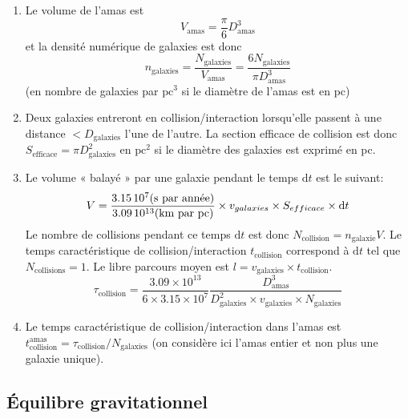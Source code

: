 \documentclass[a4paper,10pt]{report}
\renewcommand{\d}{\ensuremath{\mathrm{d}}}
\renewcommand{\u}[1]{\ensuremath{\mathrm{#1}}} %
\begin{document}
\begin{Answer}
  \begin{enumerate}
  \item Le volume de l'amas est
    $$
    V_{\mathrm{amas}}=\frac{\pi}{6}D_{\mathrm{amas}}^3
    $$
    et la densité numérique de galaxies est donc
    $$
    n_{\mathrm{galaxies}}=\frac{N_{\mathrm{galaxies}}}{V_{\mathrm{amas}}}=
    \frac{6N_{\mathrm{galaxies}}}{\pi D_{\mathrm{amas}}^3}
    $$
    (en nombre de galaxies par \u{pc^3} si le diamètre de l'amas est
    en pc)

  \item Deux galaxies entreront en collision/interaction lorsqu'elle
    passent à une distance $< D_{\mathrm{galaxies}}$ l'une de
    l'autre. La section efficace de collision est donc
    $S_{\mathrm{efficace}} = \pi D^2_{\mathrm{galaxies}}$ en \u{pc^2}
    si le diamètre des galaxies est exprimé en pc.

  \item Le volume « balayé » par une galaxie pendant le temps $\d t$
    est le suivant:
    $$
    V = \frac{3.15\,10^7 \text{(s par année)}}{%
      3.09\,10^{13} \text{(km par pc)}} \times v_{galaxies} \times
    S_{efficace} \times \d t
    $$
    Le nombre de collisions pendant ce temps $\d t$ est donc
    $N_{\mathrm{collision}} = n_{\mathrm{galaxie}}V$. Le temps
    caractéristique de collision/interaction $t_{\mathrm{collision}}$
    correspond à $\d t$ tel que $N_{\mathrm{collisions}} = 1$. Le
    libre parcours moyen est $l = v_{\mathrm{galaxies}} \times
    t_{\mathrm{collision}}$.
    $$
    \tau_{\mathrm{collision}} = \frac{3.09 \times 10^{13}}{6 \times
      3.15 \times 10^7}
    \frac{D_{\mathrm{amas}}^{3}}{D_{\mathrm{galaxies}}^{2} \times
      v_{\mathrm{galaxies}} \times N_{\mathrm{galaxies}}}
    $$

  \item Le temps caractéristique de collision/interaction dans l'amas
    est $t_{\mathrm{collision}}^{\mathrm{amas}} =
    \tau_{\mathrm{collision}}/N_{\mathrm{galaxies}}$ (on considère ici
    l'amas entier et non plus une galaxie unique).
  \end{enumerate}

\end{Answer}



\subsection{Équilibre gravitationnel}
\end{document}
